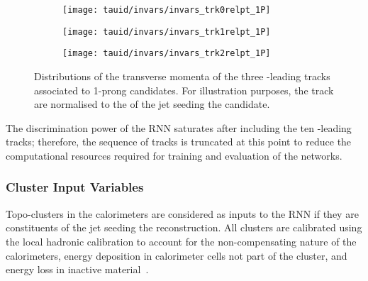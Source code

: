 \begin{figure}[htbp]
  \centering

  \begin{subfigure}{0.33\textwidth}
    \texttt{[image: tauid/invars/invars\_trk0relpt\_1P]}
    \subcaption{}%
    \label{fig:tauid_low_level_variables_track0}
  \end{subfigure}%
  \begin{subfigure}{0.33\textwidth}
    \texttt{[image: tauid/invars/invars\_trk1relpt\_1P]}
    \subcaption{}%
    \label{fig:tauid_low_level_variables_track1}
  \end{subfigure}%
  \begin{subfigure}{0.33\textwidth}
    \texttt{[image: tauid/invars/invars\_trk2relpt\_1P]}
    \subcaption{}%
    \label{fig:tauid_low_level_variables_track2}
  \end{subfigure}

  \caption[Distributions of the transverse momenta of the three \pT-leading
  tracks associated to 1-prong \tauhadvis candidates.]{Distributions of the
    transverse momenta of the three \pT-leading tracks associated to 1-prong
    \tauhadvis candidates. For illustration purposes, the track \pT are
    normalised to the \pT of the jet seeding the \tauhadvis candidate.}%
  \label{fig:tauid_low_level_variables_track}
\end{figure}

The discrimination power of the RNN \tauid saturates after including the ten
\pT-leading tracks; therefore, the sequence of tracks is truncated at this point
to reduce the computational resources required for training and evaluation of
the networks.


\subsubsection{Cluster Input Variables}

Topo-clusters in the calorimeters are considered as inputs to the RNN \tauid if
they are constituents of the jet seeding the \tauhadvis reconstruction. All
clusters are calibrated using the local hadronic calibration to account for the
non-compensating nature of the calorimeters, energy deposition in calorimeter
cells not part of the cluster, and energy loss in inactive
material~\cite{PERF-2014-07}.

